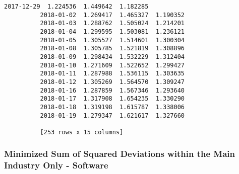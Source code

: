 \documentclass[11pt]{article}
\begin{document}
\begin{Verbatim}[commandchars=\\\{\}]
          2017-12-29  1.224536  1.449642  1.182285  
          2018-01-02  1.269417  1.465327  1.190352  
          2018-01-03  1.288762  1.505024  1.214201  
          2018-01-04  1.299595  1.503081  1.236121  
          2018-01-05  1.305527  1.514601  1.300304  
          2018-01-08  1.305785  1.521819  1.308896  
          2018-01-09  1.298434  1.532229  1.312404  
          2018-01-10  1.271609  1.522652  1.299427  
          2018-01-11  1.287988  1.536115  1.303635  
          2018-01-12  1.305269  1.564570  1.309247  
          2018-01-16  1.287859  1.567346  1.293640  
          2018-01-17  1.317908  1.654235  1.330290  
          2018-01-18  1.319198  1.615787  1.338006  
          2018-01-19  1.279347  1.621617  1.327660  
          
          [253 rows x 15 columns]
\end{Verbatim}
            
    \subsubsection{Minimized Sum of Squared Deviations within the Main
Industry Only -
Software}\label{minimized-sum-of-squared-deviations-within-the-main-industry-only---software}
\end{document}
